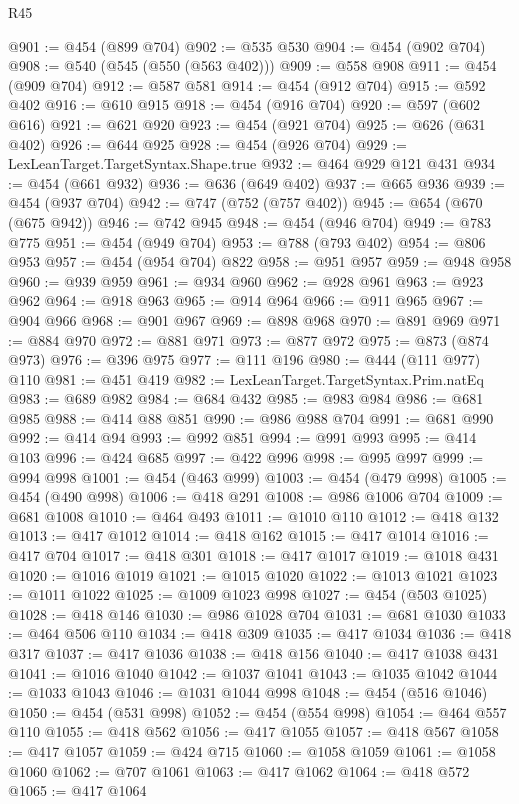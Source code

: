 \begin{lexlean}{R45}
\begin{coremodule}
{{{{{{{{{{{{{{{{{{{{{{{{{{{{{{{{{{{{{{{{{{{{{{{{{{{{{{{{{{{{{{{{{{{{{{{{{{{{{{{{{{{{{{{{{{{@901 := @454 (@899 @704)
@902 := @535 @530
@904 := @454 (@902 @704)
@908 := @540 (@545 (@550 (@563 @402)))
@909 := @558 @908
@911 := @454 (@909 @704)
@912 := @587 @581
@914 := @454 (@912 @704)
@915 := @592 @402
@916 := @610 @915
@918 := @454 (@916 @704)
@920 := @597 (@602 @616)
@921 := @621 @920
@923 := @454 (@921 @704)
@925 := @626 (@631 @402)
@926 := @644 @925
@928 := @454 (@926 @704)
@929 := LexLeanTarget.TargetSyntax.Shape.true
@932 := @464 @929 @121 @431
@934 := @454 (@661 @932)
@936 := @636 (@649 @402)
@937 := @665 @936
@939 := @454 (@937 @704)
@942 := @747 (@752 (@757 @402))
@945 := @654 (@670 (@675 @942))
@946 := @742 @945
@948 := @454 (@946 @704)
@949 := @783 @775
@951 := @454 (@949 @704)
@953 := @788 (@793 @402)
@954 := @806 @953
@957 := @454 (@954 @704) @822
@958 := @951 @957
@959 := @948 @958
@960 := @939 @959
@961 := @934 @960
@962 := @928 @961
@963 := @923 @962
@964 := @918 @963
@965 := @914 @964
@966 := @911 @965
@967 := @904 @966
@968 := @901 @967
@969 := @898 @968
@970 := @891 @969
@971 := @884 @970
@972 := @881 @971
@973 := @877 @972
@975 := @873 (@874 @973)
@976 := @396 @975
@977 := @111 @196
@980 := @444 (@111 @977) @110
@981 := @451 @419
@982 := LexLeanTarget.TargetSyntax.Prim.natEq
@983 := @689 @982
@984 := @684 @432
@985 := @983 @984
@986 := @681 @985
@988 := @414 @88 @851
@990 := @986 @988 @704
@991 := @681 @990
@992 := @414 @94
@993 := @992 @851
@994 := @991 @993
@995 := @414 @103
@996 := @424 @685
@997 := @422 @996
@998 := @995 @997
@999 := @994 @998
@1001 := @454 (@463 @999)
@1003 := @454 (@479 @998)
@1005 := @454 (@490 @998)
@1006 := @418 @291
@1008 := @986 @1006 @704
@1009 := @681 @1008
@1010 := @464 @493
@1011 := @1010 @110
@1012 := @418 @132
@1013 := @417 @1012
@1014 := @418 @162
@1015 := @417 @1014
@1016 := @417 @704
@1017 := @418 @301
@1018 := @417 @1017
@1019 := @1018 @431
@1020 := @1016 @1019
@1021 := @1015 @1020
@1022 := @1013 @1021
@1023 := @1011 @1022
@1025 := @1009 @1023 @998
@1027 := @454 (@503 @1025)
@1028 := @418 @146
@1030 := @986 @1028 @704
@1031 := @681 @1030
@1033 := @464 @506 @110
@1034 := @418 @309
@1035 := @417 @1034
@1036 := @418 @317
@1037 := @417 @1036
@1038 := @418 @156
@1040 := @417 @1038 @431
@1041 := @1016 @1040
@1042 := @1037 @1041
@1043 := @1035 @1042
@1044 := @1033 @1043
@1046 := @1031 @1044 @998
@1048 := @454 (@516 @1046)
@1050 := @454 (@531 @998)
@1052 := @454 (@554 @998)
@1054 := @464 @557 @110
@1055 := @418 @562
@1056 := @417 @1055
@1057 := @418 @567
@1058 := @417 @1057
@1059 := @424 @715
@1060 := @1058 @1059
@1061 := @1058 @1060
@1062 := @707 @1061
@1063 := @417 @1062
@1064 := @418 @572
@1065 := @417 @1064
}}}}}}}}}}}}}}}}}}}}}}}}}}}}}}}}}}}}}}}}}}}}}}}}}}}}}}}}}}}}}}}}}}}}}}}}}}}}}}}}}}}}}}}}}}}
\end{coremodule}
\end{lexlean}

